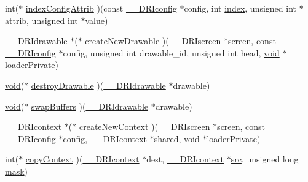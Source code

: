 \begin{DoxyCompactItemize}
\item 
int($\ast$ \hyperlink{struct_____d_r_icore_extension_rec_a400d591a81525ef10d04b98d93f59ae6}{index\-Config\-Attrib} )(const \hyperlink{dri__interface_8h_aeac81999efbbf8b1d6886338e3ea24d9}{\-\_\-\-\_\-\-D\-R\-Iconfig} $\ast$config, int \hyperlink{glext_8h_a57f14e05b1900f16a2da82ade47d0c6d}{index}, unsigned int $\ast$attrib, unsigned int $\ast$\hyperlink{glext_8h_a79169be77d7e02a24f68a5bfe627dc29}{value})
\item 
\hyperlink{dri__interface_8h_a5bfb832a0a08208d95b3bbef439d2262}{\-\_\-\-\_\-\-D\-R\-Idrawable} $\ast$($\ast$ \hyperlink{struct_____d_r_icore_extension_rec_a9b214cbc2041b95158ba16b4dc663604}{create\-New\-Drawable} )(\hyperlink{dri__interface_8h_a9961b01d421ee1fd6ed3c05acc9ca561}{\-\_\-\-\_\-\-D\-R\-Iscreen} $\ast$screen, const \hyperlink{dri__interface_8h_aeac81999efbbf8b1d6886338e3ea24d9}{\-\_\-\-\_\-\-D\-R\-Iconfig} $\ast$config, unsigned int drawable\-\_\-id, unsigned int head, \hyperlink{glu_8h_a4292190e3f1f6b373a760c7d9316ad3c}{void} $\ast$loader\-Private)
\item 
\hyperlink{glu_8h_a4292190e3f1f6b373a760c7d9316ad3c}{void}($\ast$ \hyperlink{struct_____d_r_icore_extension_rec_a82b397efee01051d5797a1e1d77b8cec}{destroy\-Drawable} )(\hyperlink{dri__interface_8h_a5bfb832a0a08208d95b3bbef439d2262}{\-\_\-\-\_\-\-D\-R\-Idrawable} $\ast$drawable)
\item 
\hyperlink{glu_8h_a4292190e3f1f6b373a760c7d9316ad3c}{void}($\ast$ \hyperlink{struct_____d_r_icore_extension_rec_ae87dc970a4508935533c226d2cc38830}{swap\-Buffers} )(\hyperlink{dri__interface_8h_a5bfb832a0a08208d95b3bbef439d2262}{\-\_\-\-\_\-\-D\-R\-Idrawable} $\ast$drawable)
\item 
\hyperlink{dri__interface_8h_a3fd295cba82b5a3d79f1ee7e12bfb908}{\-\_\-\-\_\-\-D\-R\-Icontext} $\ast$($\ast$ \hyperlink{struct_____d_r_icore_extension_rec_a30d6170fea13798429c529fb2bbb3b7a}{create\-New\-Context} )(\hyperlink{dri__interface_8h_a9961b01d421ee1fd6ed3c05acc9ca561}{\-\_\-\-\_\-\-D\-R\-Iscreen} $\ast$screen, const \hyperlink{dri__interface_8h_aeac81999efbbf8b1d6886338e3ea24d9}{\-\_\-\-\_\-\-D\-R\-Iconfig} $\ast$config, \hyperlink{dri__interface_8h_a3fd295cba82b5a3d79f1ee7e12bfb908}{\-\_\-\-\_\-\-D\-R\-Icontext} $\ast$shared, \hyperlink{glu_8h_a4292190e3f1f6b373a760c7d9316ad3c}{void} $\ast$loader\-Private)
\item 
int($\ast$ \hyperlink{struct_____d_r_icore_extension_rec_a74b07ad3c83c038d8361f97933891d35}{copy\-Context} )(\hyperlink{dri__interface_8h_a3fd295cba82b5a3d79f1ee7e12bfb908}{\-\_\-\-\_\-\-D\-R\-Icontext} $\ast$dest, \hyperlink{dri__interface_8h_a3fd295cba82b5a3d79f1ee7e12bfb908}{\-\_\-\-\_\-\-D\-R\-Icontext} $\ast$\hyperlink{glext_8h_a2a98ddb6f79ec1048ff9e15cdd2422ba}{src}, unsigned long \hyperlink{glext_8h_abb269dedb7ad104274cc9f5c0c7285bc}{mask})

\end{DoxyCompactItemize}
